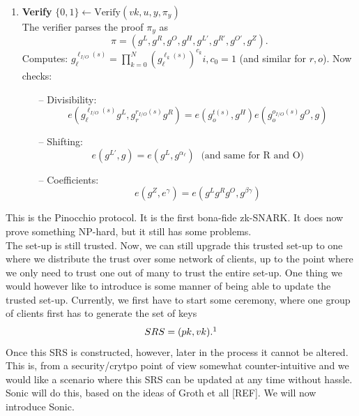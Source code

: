 \documentclass[11pt,oneside]{article}
\theoremstyle{definition}
\theoremstyle{remark}
\numberwithin{equation}{section}
\begin{document}
{{{\begin{enumerate}
  circuit to obtain $y\leftarrow F(u)$ and thus learns the values
  $\{c_i\}_{i\in[0,\ldots,m]}$ that are assigned to the wires.\\
  Prover computes $h(X)$ such that $p(X)=h(X)t(X)$ and cooks up the proof
  $\pi_y$:
  \begin{align}\nonumber
   \pi_y = \big(
     g_\ell^{\ell_{mid}(s)}, g_r^{r_{mid}(s)}, g_o^{o_{mid}(s)},
     h^{h(s)}, g_\ell^{\alpha_\ell \ell_{mid}}, g_r^{\alpha_r r_{mid}(s)}, \\\nonumber
g_o^{\alpha_o
     o_{mid}(s)}, g_\ell^{\beta \ell_{mid}(s)}g_r^{\beta r_{mid}(s)}g_o^{\beta o_{mid}(s)}
    \big) 
  \end{align}
  where $\xi_{mid}(x)=\sum\limits_{k\in I_{mid}} c_k\, \xi_k(x)$ for
  $\xi\in\{\ell,r,o\}$

\item
  \textbf{Verify} $\{0,1\}\leftarrow \text{Verify}(vk,u,y,\pi_y)$\\
The verifier parses the proof $\pi_y$ as
\[\pi=(g^L,g^R,g^O,g^H,g^{L'},g^{R'},g^{O'},g^Z).\] Computes:
$g_\ell^{\ell_{I/O}(s)}=\prod\limits_{k=0}^N\left(g_\ell^{\ell_k(s)}\right)^{c_k}i,
c_0=1$
(and similar for $r,o$). Now checks:
\begin{itemize}
  \item[--] Divisibility: \[ e(g_\ell^{\ell_{I/O}(s)}g^L, g_r^{r_{I/O}(s)}g^R) =
e(g_o^{t(s)},g^H)e(g_o^{o_{I/O}(s)}g^O,g)  \]
\item[--] Shifting: \[ e(g^{L'},g) = e(g^L,g^{\alpha_\ell})\; \text{ (and same for R
  and O)} \]
\item[--] Coefficients: \[ e(g^Z,e^\gamma) = e(g^Lg^Rg^O,g^{\beta\gamma}) \]
\end{itemize}
\end{enumerate}  }  } }
\newline
\newpage
This is the Pinocchio protocol. It is the first bona-fide zk-SNARK. It does now
prove something NP-hard, but it still has some problems.\\ The set-up is still
trusted. Now, we can still upgrade this trusted set-up to one where we
distribute the trust over some network of clients, up to the point where we only
need to trust one out of many to trust the entire set-up. One thing we would
however like to introduce is some manner of being able to update the trusted
set-up. Currently, we first have to start some ceremony, where one group of
clients first has to generate the set of keys \[SRS=(pk,vk).\footnote{This set
is commonly referred to as the SRS: the structured reference string}\] Once this
SRS is constructed, however, later in the process it cannot be altered. This is,
from a security/crytpo point of view somewhat counter-intuitive and we would
like a scenario where this SRS can be updated at any time without hassle. Sonic
will do this, based on the ideas of Groth et all [REF]. We will now introduce
Sonic.
\end{document}
